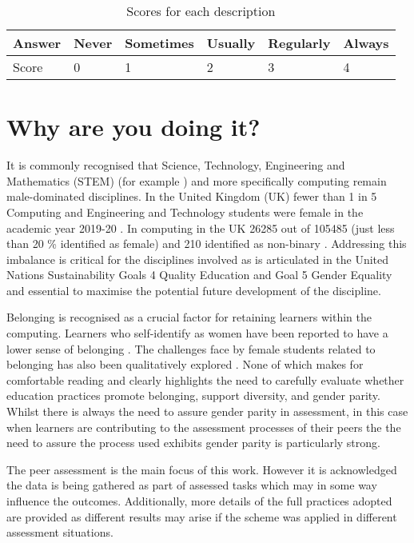 \documentclass[sigconf, anonymous=true]{acmart}
\begin{document}
\begin{table}[]
\caption{Scores for each description}
\begin{tabular}{|l|l|l|l|l|l|}
\hline
Answer & Never & Sometimes & Usually & Regularly & Always \\ \hline
Score  & 0     & 1         & 2       & 3         & 4      \\ \hline
\end{tabular}
\label{tab:scores}
\end{table}


\section{Why are you doing it?}
It is commonly recognised that Science, Technology, Engineering and Mathematics (STEM) (for example \cite{Baird2018}) and more specifically computing remain male-dominated disciplines. In the United Kingdom (UK) fewer than 1 in 5 Computing and Engineering and Technology students were female in the academic year 2019-20 \cite{HESA}. In computing in the UK 26285 out of 105485 (just less than 20 \% identified as female) and 210 identified as non-binary \cite{HESA}. Addressing this imbalance is critical for the disciplines involved as is articulated in the United Nations Sustainability Goals 4 Quality Education and Goal 5 Gender Equality \cite{UN} and essential to maximise the potential future development of the discipline.

Belonging \cite{Veilleux2013} is recognised as a crucial factor for retaining learners within the computing. Learners who self-identify as women have been reported to have a lower sense of belonging \cite{Mooney2020}. The challenges face by female students related to belonging has also been qualitatively explored \cite{Winter2021}. None of which makes for comfortable reading and clearly highlights the need to carefully evaluate whether education practices promote belonging, support diversity, and gender parity. Whilst there is always the need to assure gender parity in assessment, in this case when learners are contributing to the assessment processes of their peers the the need to assure the process used exhibits gender parity is particularly strong. 

The peer assessment is the main focus of this work. However it is acknowledged the data is being gathered as part of assessed tasks which may in some way influence the outcomes. Additionally, more details of the full practices adopted are provided as different results may arise if the scheme was applied in different assessment situations.
\end{document}
